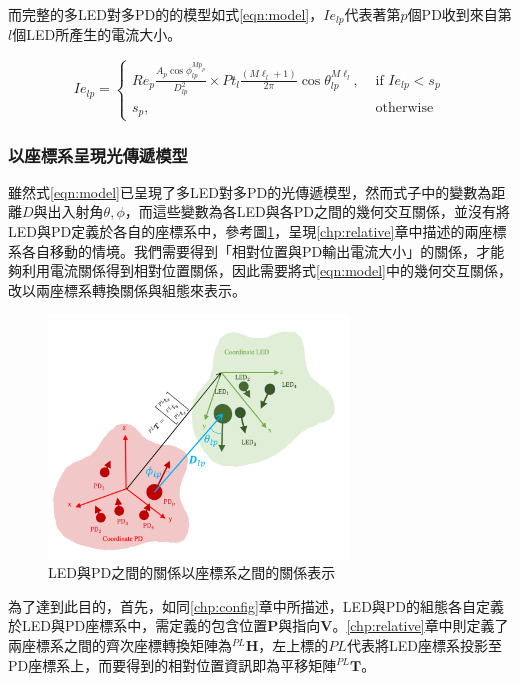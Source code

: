     而完整的多LED對多PD的的模型如式\ref{eqn:model}，$Ie_{lp}$代表著第$p$個PD收到來自第$l$個LED所產生的電流大小。
    
    \begin{equation}
        \label{eqn:model}
        Ie_{lp} = \begin{cases}Re_p \frac{ A_p\cos\phi_{lp}^{Mp_{p}} }{D^2_{lp}}\times Pt_l\frac{(M\ell_{l}+1)}{2 \pi} \cos \theta_{lp}^{M\ell_{l}}, & \text { if } Ie_{lp}<s_p \\ s_p, & \text { otherwise }\end{cases}
    \end{equation}

    




    \subsubsection{以座標系呈現光傳遞模型}
    \label{chp:model_transform}

    雖然式\ref{eqn:model}已呈現了多LED對多PD的光傳遞模型，然而式子中的變數為距離$D$與出入射角$\theta,\phi$，而這些變數為各LED與各PD之間的幾何交互關係，並沒有將LED與PD定義於各自的座標系中，參考圖\ref{pic:relative_vs_coor}，呈現\ref{chp:relative}章中描述的兩座標系各自移動的情境。我們需要得到「相對位置與PD輸出電流大小」的關係，才能夠利用電流關係得到相對位置關係，因此需要將式\ref{eqn:model}中的幾何交互關係，改以兩座標系轉換關係與組態來表示。

    \begin{figure}[h]
        \centering
        \includegraphics[width=8cm]{ch2pic/relative_vs_coor.png}
        \caption{LED與PD之間的關係以座標系之間的關係表示}
        \label{pic:relative_vs_coor}
    \end{figure}

    為了達到此目的，首先，如同\ref{chp:config}章中所描述，LED與PD的組態各自定義於LED與PD座標系中，需定義的包含位置$\boldsymbol{P}$與指向$\boldsymbol{V}$。\ref{chp:relative}章中則定義了兩座標系之間的齊次座標轉換矩陣為$^{PL}\boldsymbol{H}$，左上標的$PL$代表將LED座標系投影至PD座標系上，而要得到的相對位置資訊即為平移矩陣$^{PL}\boldsymbol{T}$。

